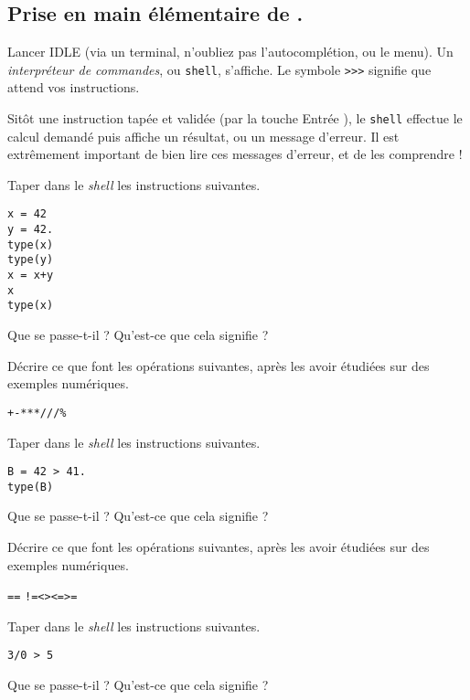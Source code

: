 \subsection{Prise en main élémentaire de \python{}.} \label{tp02:sec:python}

Lancer IDLE (via un terminal, n'oubliez pas l'autocomplétion, ou le menu). Un \emph{interpréteur de commandes}, ou \texttt{shell}, s'affiche. 
Le symbole \texttt{>}\texttt{>}\texttt{>} signifie que \python{} attend vos instructions. 

Sitôt une instruction tapée et validée (par la touche \og Entrée \fg{}), le \texttt{shell} effectue le calcul demandé puis affiche un résultat, ou un message d'erreur. 
Il est extrêmement important de bien lire ces messages d'erreur, et de les comprendre ! 

\medskip{}

\question{} Taper dans le \emph{shell} les instructions suivantes. 
\begin{verbatim}
x = 42
y = 42.
type(x)
type(y)
x = x+y
x
type(x)
\end{verbatim}
Que se passe-t-il ? Qu'est-ce que cela signifie ?

\medskip{}

\question{} Décrire ce que font les opérations suivantes, après les avoir étudiées sur des exemples numériques.
\begin{center}
  \texttt{+}\qquad \texttt{-}\qquad \texttt{*}\qquad \texttt{**}\qquad \texttt{/}\qquad \texttt{//}\qquad \texttt{\%}
\end{center}


\question{} Taper dans le \emph{shell} les instructions suivantes. 
\begin{verbatim}
B = 42 > 41.
type(B)
\end{verbatim}
Que se passe-t-il ? Qu'est-ce que cela signifie ?

\medskip{}

\question{} Décrire ce que font les opérations suivantes, après les avoir étudiées sur des exemples numériques.
\begin{center}
  \texttt{==} {} \qquad{} \texttt{!=}\qquad\texttt{<}\qquad\texttt{>}\qquad\texttt{<=}\qquad\texttt{>=}
\end{center}

\medskip{}

\question{} Taper dans le \emph{shell} les instructions suivantes. 
\begin{verbatim}
3/0 > 5
\end{verbatim}
Que se passe-t-il ? Qu'est-ce que cela signifie ?
\medskip{}

